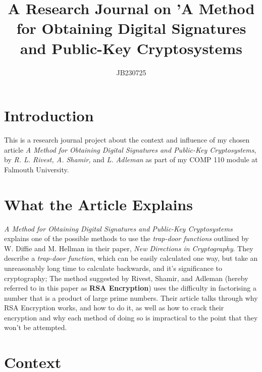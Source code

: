 \documentclass{article}
\title{A Research Journal on 'A Method for Obtaining Digital Signatures and Public-Key Cryptosystems}
\author{JB230725}
\begin{document}
\maketitle

\section{Introduction}

This is a research journal project about the context and influence of my chosen article \textit{A Method for Obtaining Digital Signatures and Public-Key Cryptosystems}, by \textit{R. L. Rivest, A. Shamir,} and \textit{L. Adleman} \cite{rivest1978_rsa} as part of my COMP 110 module at Falmouth University.

\section{What the Article Explains}

\textit{A Method for Obtaining Digital Signatures and Public-Key Cryptosystems} explains one of the possible methods to use the \textit{trap-door functions} outlined by W. Diffie and M. Hellman in their paper, \textit{New Directions in Cryptography}\cite{diffie1976new}. They describe a \textit{trap-door function}, which can be easily calculated one way, but take an unreasonably long time to calculate backwards, and it's significance to cryptography; The method suggested by Rivest, Shamir, and Adleman (hereby referred to in this paper as \textbf{RSA Encryption}) uses the difficulty in factorising a number that is a product of large prime numbers. \newline
Their article talks through why RSA Encryption works, and how to do it, as well as how to crack their encryption and why each method of doing so is impractical to the point that they won't be attempted.

\section{Context}
\end{document}
